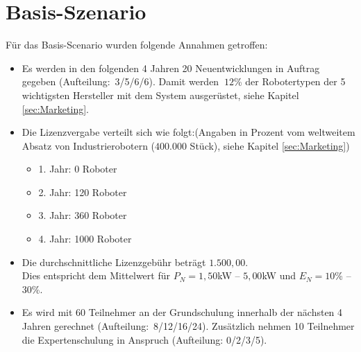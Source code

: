 \section{Basis-Szenario}
Für das Basis-Scenario wurden folgende Annahmen getroffen:
\begin{itemize}
	\item Es werden in den folgenden 4 Jahren 20 Neuentwicklungen in Auftrag gegeben (Aufteilung:~3/5/6/6). Damit werden $~12$\% der Robotertypen der 5 wichtigsten Hersteller mit dem System ausgerüstet, siehe Kapitel \ref{sec:Marketing}.
	\item Die Lizenzvergabe verteilt sich wie folgt:\newline (Angaben in Prozent vom weltweitem Absatz von Industrierobotern ($400.000$ Stück), siehe Kapitel \ref{sec:Marketing})
	\begin{itemize}
		\item 1. Jahr: 0 Roboter
		\item 2. Jahr: 120 Roboter
		\item 3. Jahr: 360 Roboter
		\item 4. Jahr: 1000 Roboter
	\end{itemize}
	\item Die durchschnittliche Lizenzgebühr beträgt $1.500,00$\officialeuro.\\ Dies entspricht dem Mittelwert für $P_N = 1,50$kW -- $5,00$kW und $E_N = 10$\% -- $30$\%.
	\item Es wird mit 60 Teilnehmer an der Grundschulung innerhalb der nächsten 4 Jahren gerechnet (Aufteilung:~8/12/16/24). Zusätzlich nehmen 10 Teilnehmer die Expertenschulung in Anspruch (Aufteilung: 0/2/3/5).
\end{itemize}

\newpage
